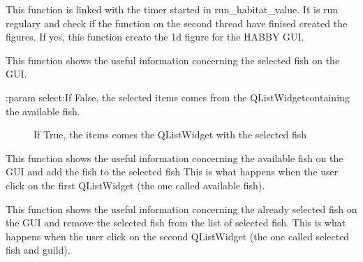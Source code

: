 \documentclass[letterpaper,10pt,english]{sphinxmanual}
\begin{document}
\begin{fulllineitems}

\begin{fulllineitems}
\label{\detokenize{index:src_GUI.bio_info_GUI.BioInfo.show_image_hab}}
This function is linked with the timer started in run\_habitat\_value. It is run regulary and
check if the function on the second thread have finised created the figures. If yes,
this function create the 1d figure for the HABBY GUI.

\end{fulllineitems}


\begin{fulllineitems}
\label{\detokenize{index:src_GUI.bio_info_GUI.BioInfo.show_info_fish}}
This function shows the useful information concerning the selected fish on the GUI.
\begin{description}
\item[{:param select:If False, the selected items comes from the QListWidgetcontaining the available fish.}] \leavevmode
If True, the items comes the QListWidget with the selected fish

\end{description}

\end{fulllineitems}


\begin{fulllineitems}
\label{\detokenize{index:src_GUI.bio_info_GUI.BioInfo.show_info_fish_avai}}
This function shows the useful information concerning the available fish on the GUI and
add the fish to  the selected fish This is what happens when the user click on the
first QListWidget (the one called available fish).

\end{fulllineitems}


\begin{fulllineitems}
\label{\detokenize{index:src_GUI.bio_info_GUI.BioInfo.show_info_fish_sel}}
This function shows the useful information concerning the already selected fish on the GUI and
remove the selected fish from the list of selected fish. This is what happens when the user click on the
second QListWidget (the one called selected fish and guild).


\end{fulllineitems}
\end{fulllineitems}
\end{document}
